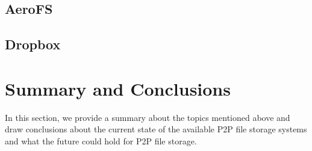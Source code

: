 \subsection{AeroFS} %

\subsection{Dropbox} %

\section{Summary and Conclusions} In this section, we provide a summary about
the topics mentioned above and draw conclusions about the current state of the
available P2P file storage systems and what the future could hold for P2P file
storage.

